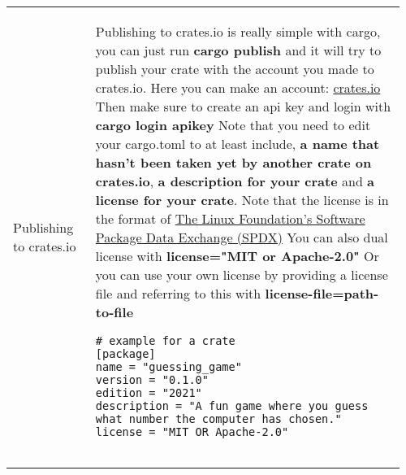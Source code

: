 \documentclass[main.tex,fontsize=8pt,paper=a4,paper=portrait,DIV=calc,]{scrartcl}
\begin{document}
\begin{table}[ht!]
\begin{tabular}{|m{0.2\linewidth}|m{0.755\linewidth}|}
\hline
Publishing to crates.io & 
Publishing to crates.io is really simple with cargo, you can just run \textbf{cargo publish} and it will try to publish your crate with the account you made to crates.io.\newline
Here you can make an account: \href{https://crates.io/}{crates.io}\newline
\textcolor{OliveGreen}{Then make sure to create an api key and login with \textbf{cargo login apikey}}\newline
Note that you need to edit your cargo.toml to at least include, \textbf{a name that hasn't been taken yet by another crate on crates.io}, \textbf{a description for your crate} and \textbf{a license for your crate}.\newline
Note that the license is in the format of \href{https://spdx.org/licenses/}{The Linux Foundation’s Software Package Data Exchange (SPDX)}\newline
You can also dual license with \textbf{license="MIT or Apache-2.0"}\newline
Or you can use your own license by providing a license file and referring to this with \textbf{license-file=path-to-file}\newline
\begin{lstlisting}
# example for a crate
[package]
name = "guessing_game"
version = "0.1.0"
edition = "2021"
description = "A fun game where you guess what number the computer has chosen."
license = "MIT OR Apache-2.0"


\end{lstlisting}
\end{tabular}
\end{table}
\end{document}
